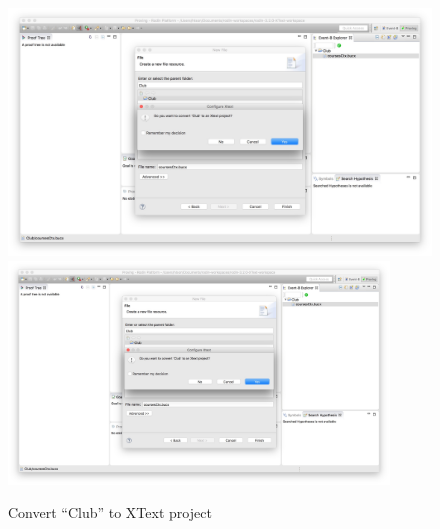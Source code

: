 \begin{description}
\begin{figure}[!htbp]
  \centering
  \ifplastex
  \includegraphics[width=512]{figures/ConvertToXText}
  \else
  \includegraphics[width=0.9\textwidth]{figures/ConvertToXText}
  \fi
  \caption{Convert ``Club'' to XText project}
  \label{fig:ConvertToXText}
\end{figure}


\end{description}
